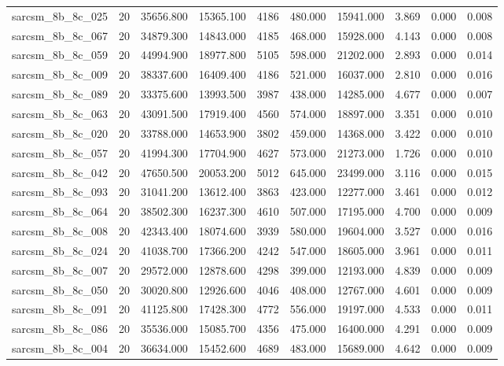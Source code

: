 \begin{tabular}{lrrrrrrrrr}
sarcsm\_8b\_8c\_025 & 20 & 35656.800 & 15365.100 & 4186 & 480.000 & 15941.000 & 3.869 & 0.000 & 0.008 \\
sarcsm\_8b\_8c\_067 & 20 & 34879.300 & 14843.000 & 4185 & 468.000 & 15928.000 & 4.143 & 0.000 & 0.008 \\
sarcsm\_8b\_8c\_059 & 20 & 44994.900 & 18977.800 & 5105 & 598.000 & 21202.000 & 2.893 & 0.000 & 0.014 \\
sarcsm\_8b\_8c\_009 & 20 & 38337.600 & 16409.400 & 4186 & 521.000 & 16037.000 & 2.810 & 0.000 & 0.016 \\
sarcsm\_8b\_8c\_089 & 20 & 33375.600 & 13993.500 & 3987 & 438.000 & 14285.000 & 4.677 & 0.000 & 0.007 \\
sarcsm\_8b\_8c\_063 & 20 & 43091.500 & 17919.400 & 4560 & 574.000 & 18897.000 & 3.351 & 0.000 & 0.010 \\
sarcsm\_8b\_8c\_020 & 20 & 33788.000 & 14653.900 & 3802 & 459.000 & 14368.000 & 3.422 & 0.000 & 0.010 \\
sarcsm\_8b\_8c\_057 & 20 & 41994.300 & 17704.900 & 4627 & 573.000 & 21273.000 & 1.726 & 0.000 & 0.010 \\
sarcsm\_8b\_8c\_042 & 20 & 47650.500 & 20053.200 & 5012 & 645.000 & 23499.000 & 3.116 & 0.000 & 0.015 \\
sarcsm\_8b\_8c\_093 & 20 & 31041.200 & 13612.400 & 3863 & 423.000 & 12277.000 & 3.461 & 0.000 & 0.012 \\
sarcsm\_8b\_8c\_064 & 20 & 38502.300 & 16237.300 & 4610 & 507.000 & 17195.000 & 4.700 & 0.000 & 0.009 \\
sarcsm\_8b\_8c\_008 & 20 & 42343.400 & 18074.600 & 3939 & 580.000 & 19604.000 & 3.527 & 0.000 & 0.016 \\
sarcsm\_8b\_8c\_024 & 20 & 41038.700 & 17366.200 & 4242 & 547.000 & 18605.000 & 3.961 & 0.000 & 0.011 \\
sarcsm\_8b\_8c\_007 & 20 & 29572.000 & 12878.600 & 4298 & 399.000 & 12193.000 & 4.839 & 0.000 & 0.009 \\
sarcsm\_8b\_8c\_050 & 20 & 30020.800 & 12926.600 & 4046 & 408.000 & 12767.000 & 4.601 & 0.000 & 0.009 \\
sarcsm\_8b\_8c\_091 & 20 & 41125.800 & 17428.300 & 4772 & 556.000 & 19197.000 & 4.533 & 0.000 & 0.011 \\
sarcsm\_8b\_8c\_086 & 20 & 35536.000 & 15085.700 & 4356 & 475.000 & 16400.000 & 4.291 & 0.000 & 0.009 \\
sarcsm\_8b\_8c\_004 & 20 & 36634.000 & 15452.600 & 4689 & 483.000 & 15689.000 & 4.642 & 0.000 & 0.009 \\

\end{tabular}

